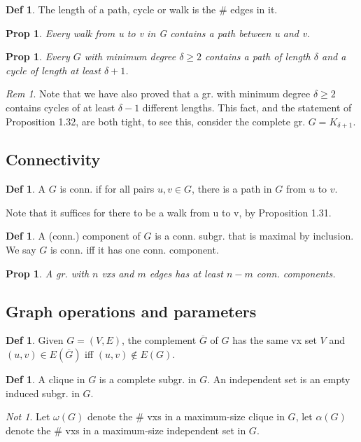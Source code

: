 \documentclass[11pt, fleqn, a4paper, landscape]{article}
\theoremstyle{plain} %
\newtheorem{pro}[thm]{Prop}
\theoremstyle{remark} %
\newtheorem{rem}[thm]{Rem}
\newtheorem{nota}[thm]{Not}
\theoremstyle{definition} %
\newtheorem{defi}[thm]{Def}
\begin{document}
\begin{multicols}{5}
\begin{defi}
The length of a path, cycle or walk is the \# edges in it.
\end{defi}
\addtocounter{thm}{1}
\begin{pro}
Every walk from u to v in G contains a path between u and v.
\end{pro}

\begin{pro}
Every $G$ with minimum degree $ \delta\ge 2$ contains a path of length $\delta$ and a cycle of length at least $\delta + 1$.
\end{pro}

\begin{rem}
Note that we have also proved that a gr. with minimum degree $\delta\ge 2$ contains cycles of at least $\delta-1$ different lengths. This fact, and the statement of Proposition 1.32, are both tight, to see this, consider the complete gr. $G = K_{\delta+1}$.
\end{rem} 

\subsection{Connectivity}

\begin{defi}
A $G$ is conn. if for all pairs $u, v \in G$, there is a path in $G$ from $u$ to $v$.
\end{defi}
Note that it suffices for there to be a walk from u to v, by Proposition 1.31.
\addtocounter{thm}{1}
\begin{defi}
A (conn.) component of $G$ is a conn. subgr. that is maximal by inclusion. We say $G$ is conn. iff it has one conn. component.
\end{defi}
\addtocounter{thm}{1}
\begin{pro}
A gr. with $n$ vxs and $m$ edges has at least $n-m$ conn. components.
\end{pro}

\subsection{Graph operations and parameters}

\begin{defi}
Given $G = (V,E)$, the complement $\overline{G}$ of $G$ has the same vx set $V$ and $(u, v) \in E(\overline{G})$ iff $(u, v) \notin E(G)$.
\end{defi}
\addtocounter{thm}{1}
\begin{defi}
A clique in $G$ is a complete subgr. in $G$. An independent set is an empty
induced subgr. in $G$.
\end{defi}
\addtocounter{thm}{1}
\begin{nota}
Let $\omega(G)$ denote the \# vxs in a maximum-size clique in $G$, let $\alpha(G)$ denote the \# vxs in a maximum-size independent set in $G$.
\end{nota}


\end{multicols}
\end{document}

